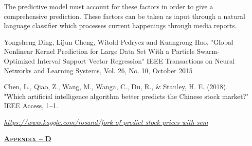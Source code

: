 \documentclass[12pt]{article}
\begin{document}
\vspace{\baselineskip}
\begin{adjustwidth}{0.5in}{0.0in}
The predictive model must account for these factors in order to give a comprehensive prediction. These factors can be taken as input through a natural language classifier which processes current happenings through media reports.\par

\end{adjustwidth}

\setlength{\parskip}{12.0pt}
\begin{justify}
 
\end{justify}\par


\vspace{\baselineskip}
\setlength{\parskip}{9.96pt}

\begin{thebibliography}{99}

\vspace{\baselineskip}
Yongsheng Ding, Lijun Cheng, Witold Pedrycz and Kuangrong Hao, "Global Nonlinear Kernel Prediction for Large Data Set With a Particle Swarm-Optimized Interval Support Vector Regression" IEEE Transactions on Neural Networks and Learning Systems, Vol. 26, No. 10, October 2015\par

Chen, L., Qiao, Z., Wang, M., Wanga, C., Du, R., $\&$  Stanley, H. E. (2018). "Which artificial intelligence algorithm better predicts the Chinese stock market?" IEEE Access, 1–1.\par

\href{https://www.kaggle.com/rosand/fork-of-predict-stock-prices-with-svm}{\textit{\textcolor[HTML]{1155CC}{\uline{https://www.kaggle.com/rosand/fork-of-predict-stock-prices-with-svm}}}}\par


\vspace{\baselineskip}

\end{thebibliography}
\setlength{\parskip}{6.0pt}



\newpage

\vspace{\baselineskip}
\vspace{\baselineskip}
\begin{Center}
\textbf{\textsc{\uline{Appendix – D}}}
\end{Center}\par
\end{document}
